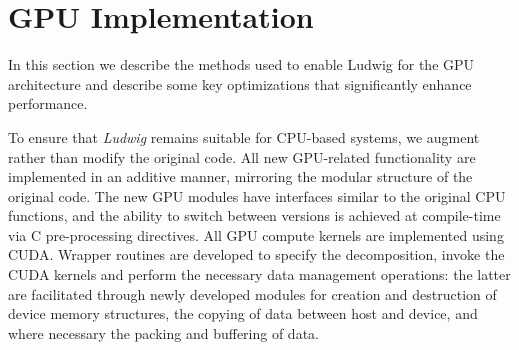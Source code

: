 \section{GPU Implementation}\label{ch14:sec:singlegpu}


In this section we describe the methods used to enable Ludwig
for the GPU architecture and describe some key optimizations that
significantly enhance performance.

To ensure that \textit{Ludwig} remains suitable for CPU-based systems,
we augment rather than modify the original code. All new GPU-related
functionality are implemented in an additive manner, mirroring the
modular structure of the original code. The new GPU modules have
interfaces similar to the original CPU functions, and the ability to
switch between versions is achieved at compile-time via C
pre-processing directives.  All GPU compute kernels are implemented using
CUDA.  Wrapper routines are developed to specify the
decomposition, invoke the CUDA kernels and perform the necessary data
management operations: the latter are facilitated through newly
developed modules for creation and destruction of device memory
structures, the copying of data between host and device, and where
necessary the packing and buffering of data.

